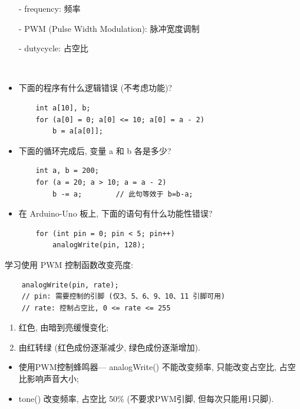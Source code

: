 \documentclass[a4paper,11pt]{seminar}
\begin{document}
\begin{itemize}
    \item[-] frequency: 频率
    \item[-] PWM (Pulse Width Modulation): 脉冲宽度调制
    \item[-] dutycycle: 占空比
\end{itemize}
\endslide

~\ \vskip-16mm ~
\begin{itemize}
    \item 下面的程序有什么逻辑错误 (不考虑功能)?
\begin{lstlisting}
    int a[10], b;
    for (a[0] = 0; a[0] <= 10; a[0] = a - 2)
        b = a[a[0]];
\end{lstlisting}
    \item 下面的循环完成后, 变量 a 和 b 各是多少?
\begin{lstlisting}
    int a, b = 200;
    for (a = 20; a > 10; a = a - 2)
        b -= a;        // 此句等效于 b=b-a;
\end{lstlisting}
    \item 在 Arduino-Uno 板上, 下面的语句有什么功能性错误?
\begin{lstlisting}
    for (int pin = 0; pin < 5; pin++)
        analogWrite(pin, 128);
\end{lstlisting}

\end{itemize}
\endslide

学习使用 PWM 控制函数改变亮度:
\begin{lstlisting}
    analogWrite(pin, rate);
    // pin: 需要控制的引脚 (仅3、5、6、9、10、11 引脚可用)
    // rate: 控制占空比, 0 <= rate <= 255
\end{lstlisting}

\begin{enumerate}
    \item 红色, 由暗到亮缓慢变化;
    \item 由红转绿 (红色成份逐渐减少, 绿色成份逐渐增加).
\end{enumerate}
\endslide


\begin{itemize}
    \item 使用PWM控制蜂鸣器--- analogWrite() 不能改变频率, 
        只能改变占空比,  占空比影响声音大小;
    \item tone() 改变频率, 占空比 50\% (不要求PWM引脚, 但每次只能用1只脚).
\end{itemize}
\end{document}

